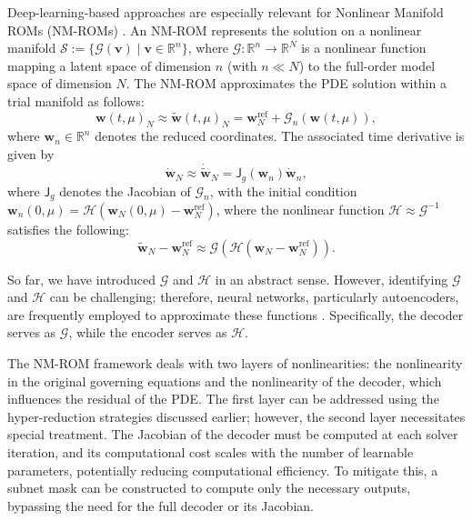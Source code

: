 \documentclass[11pt]{article}
\renewcommand{\vec}[1]{\mathbf{#1}}
\newcommand{\mat}[1]{\mathsf{#1}}
\begin{document}
Deep-learning-based approaches are especially relevant for Nonlinear Manifold ROMs (NM-ROMs) \cite{kim2022fast,jain2017quadratic}.
An NM-ROM represents the solution on a nonlinear manifold $\mathcal{S} := \{\mathscr{G} (\vec{v}) \mid \vec{v} \in \mathbb{R}^{n}\}$, where $\mathscr{G} : \mathbb{R}^{n} \rightarrow \mathbb{R}^{N}$ is a nonlinear function mapping a latent space of dimension $n$ (with $n \ll N$) to the full-order model space of dimension $N$.
The NM-ROM approximates the PDE solution within a trial manifold as follows:
\begin{equation}
    \vec{w}(t,\mu)_N \approx \widetilde{\vec{w}}(t,\mu)_N = \vec{w}^{\text{ref}}_N + \mathscr{G}_n(\vec{w}(t,\mu)),
    \label{eq:NM_ROM_gov}
\end{equation}
where $\vec{w}_n \in \mathbb{R}^{n}$ denotes the reduced coordinates.
The associated time derivative is given by
\begin{equation}
\dot{\vec{w}}_N \approx \dot{\widetilde{\vec{w}}}_N = \mat{J}_g(\vec{w}_n) \dot{\vec{w}}_n,
\end{equation}
where $\mat{J}_g$ denotes the Jacobian of $\mathscr{G}_n$, with the initial condition $\vec{w}_{n}(0,\mu) = \mathscr{H} (\vec{w}_{N}(0,\mu) - \vec{w}_N^{\text{ref}})$, where the nonlinear function  $\mathscr{H} \approx \mathscr{G}^{-1}$ satisfies the following:
\begin{equation}
    \widetilde{\vec{w}}_N - \vec{w}^{\text{ref}}_N \approx \mathscr{G}(\mathscr{H}(\vec{w}_N - \vec{w}^{\text{ref}}_N)).
\end{equation}

So far, we have introduced $\mathscr{G}$ and $\mathscr{H}$ in an abstract sense.
However, identifying \(\mathscr{G}\) and \(\mathscr{H}\) can be challenging; therefore, neural networks, particularly autoencoders, are frequently employed to approximate these functions \cite{kim2022fast}.
Specifically, the decoder serves as \(\mathscr{G}\), while the encoder serves as \(\mathscr{H}\).


The NM-ROM framework deals with two layers of nonlinearities: the nonlinearity in the original governing equations and the nonlinearity of the decoder, which influences the residual of the PDE.
The first layer can be addressed using the hyper-reduction strategies discussed earlier; however, the second layer necessitates special treatment.
The Jacobian of the decoder must be computed at each solver iteration, and its computational cost scales with the number of learnable parameters, potentially reducing computational efficiency.
To mitigate this, a subnet mask can be constructed to compute only the necessary outputs, bypassing the need for the full decoder or its Jacobian.
\end{document}
